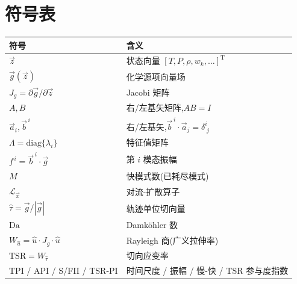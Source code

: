 \documentclass[11pt,a4paper]{article}
\newcommand{\Jg}{J_{\!g}}
\begin{document}
\section*{符号表}
\begin{center}
\begin{tabular}{ll}
\hline
符号 & 含义\\
\hline
$\vec z$ & 状态向量 $[T,P,\rho,w_k,\dots]^{\mathrm T}$ \\
$\vec g(\vec z)$ & 化学源项向量场 \\
$\Jg=\partial\vec g/\partial\vec z$ & Jacobi 矩阵 \\
$A,B$ & 右/左基矢矩阵,$AB=I$ \\
$\vec a_i,\vec b^{\,i}$ & 右/左基矢,$\vec b^{\,i}\cdot\vec a_j=\delta^{i}_{\;j}$ \\
$\Lambda=\mathrm{diag}\{\lambda_i\}$ & 特征值矩阵 \\
$f^{\,i}=\vec b^{\,i}\cdot\vec g$ & 第 $i$ 模态振幅 \\
$M$ & 快模式数(已耗尽模式) \\
$\mathcal L_{\vec x}$ & 对流-扩散算子 \\
$\hat\tau=\vec g/|\vec g|$ & 轨迹单位切向量 \\
$\mathrm{Da}$ & Damköhler 数 \\
$W_{\hat u}=\hat u\cdot\Jg\cdot\hat u$ & Rayleigh 商(广义拉伸率) \\
$\mathrm{TSR}=W_{\hat\tau}$ & 切向应变率 \\
TPI / API / S/FII / TSR-PI & 时间尺度 / 振幅 / 慢-快 / TSR 参与度指数 \\
\hline
\end{tabular}
\end{center}
\end{document}

